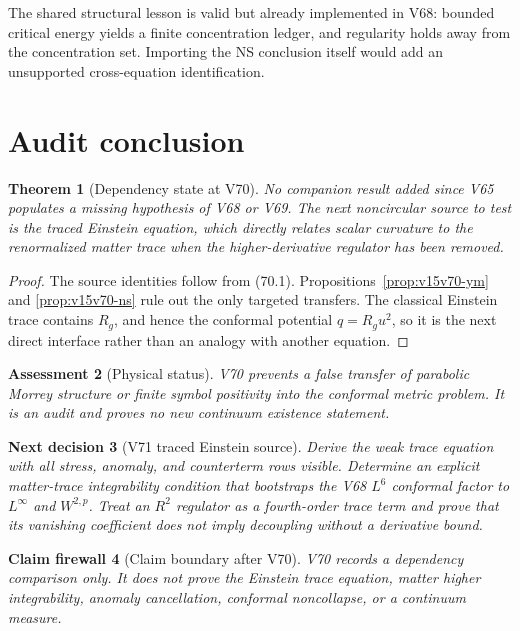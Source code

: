 \documentclass[11pt]{article}
\newtheorem{theorem}{Theorem}[section]
\newtheorem{firewall}[theorem]{Claim firewall}
\newtheorem{decision}[theorem]{Next decision}
\newtheorem{assessment}[theorem]{Assessment}
\theoremstyle{remark}
\begin{document}
The shared structural lesson is valid but already implemented in
V68: bounded critical energy yields a finite concentration ledger,
and regularity holds away from the concentration set.  Importing
the NS conclusion itself would add an unsupported cross-equation
identification.

\section{Audit conclusion}

\begin{theorem}[Dependency state at V70]
\label{thm:v15v70-conclusion}
No companion result added since V65 populates a missing hypothesis
of V68 or V69.  The next noncircular source to test is the traced
Einstein equation, which directly relates scalar curvature to the
renormalized matter trace when the higher-derivative regulator has
been removed.
\end{theorem}

\begin{proof}
The source identities follow from (70.1).
Propositions~\ref{prop:v15v70-ym} and
\ref{prop:v15v70-ns} rule out the only targeted transfers.
The classical Einstein trace contains \(R_g\), and hence the
conformal potential \(q=R_gu^2\), so it is the next direct
interface rather than an analogy with another equation.
\end{proof}

\begin{assessment}[Physical status]
\label{ass:v15v70-status}
V70 prevents a false transfer of parabolic Morrey structure or
finite symbol positivity into the conformal metric problem.  It is
an audit and proves no new continuum existence statement.
\end{assessment}

\begin{decision}[V71 traced Einstein source]
\label{dec:v15v70-next}
Derive the weak trace equation with all stress, anomaly, and
counterterm rows visible.  Determine an explicit matter-trace
integrability condition that bootstraps the V68 \(L^6\) conformal
factor to \(L^\infty\) and \(W^{2,p}\).  Treat an \(R^2\) regulator
as a fourth-order trace term and prove that its vanishing
coefficient does not imply decoupling without a derivative bound.
\end{decision}

\begin{firewall}[Claim boundary after V70]
\label{fire:v15v70}
V70 records a dependency comparison only.  It does not prove the
Einstein trace equation, matter higher integrability, anomaly
cancellation, conformal noncollapse, or a continuum measure.
\end{firewall}
\end{document}
